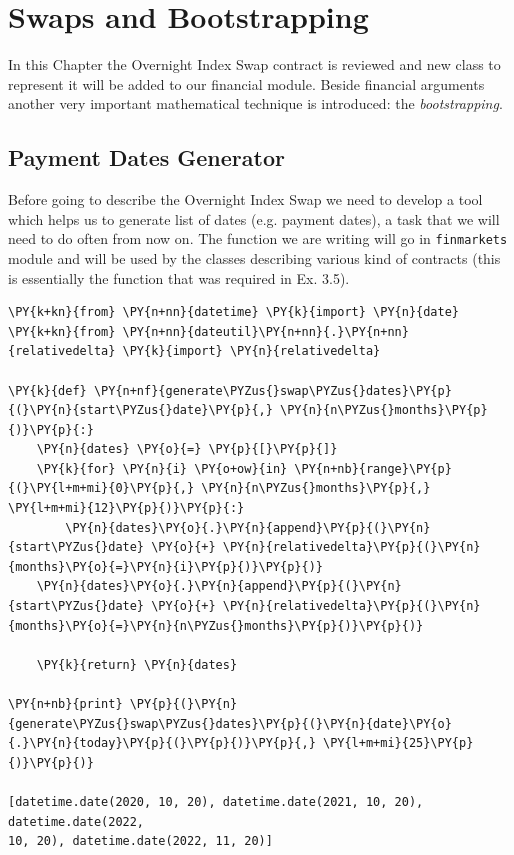 \chapter{Swaps and Bootstrapping}\label{swaps-and-bootstrapping---practical-lesson-5}


In this Chapter the Overnight Index Swap contract is reviewed and new class to represent it will be added to our financial module. Beside financial arguments another very important mathematical technique is introduced: the \emph{bootstrapping}.

\section{Payment Dates Generator}
Before going to describe the Overnight Index Swap we need to develop a tool which helps us to generate list of dates (e.g. payment dates), a task that we will need to do often from now on. 
The function we are writing will go in \texttt{finmarkets} module and will be used by the classes describing various kind of contracts (this is essentially the function that was required in Ex. 3.5).

\begin{tcolorbox}[size=fbox, boxrule=1pt, colback=cellbackground, colframe=cellborder]
\begin{Verbatim}[commandchars=\\\{\}]
\PY{k+kn}{from} \PY{n+nn}{datetime} \PY{k}{import} \PY{n}{date}
\PY{k+kn}{from} \PY{n+nn}{dateutil}\PY{n+nn}{.}\PY{n+nn}{relativedelta} \PY{k}{import} \PY{n}{relativedelta}

\PY{k}{def} \PY{n+nf}{generate\PYZus{}swap\PYZus{}dates}\PY{p}{(}\PY{n}{start\PYZus{}date}\PY{p}{,} \PY{n}{n\PYZus{}months}\PY{p}{)}\PY{p}{:}
    \PY{n}{dates} \PY{o}{=} \PY{p}{[}\PY{p}{]}
    \PY{k}{for} \PY{n}{i} \PY{o+ow}{in} \PY{n+nb}{range}\PY{p}{(}\PY{l+m+mi}{0}\PY{p}{,} \PY{n}{n\PYZus{}months}\PY{p}{,} \PY{l+m+mi}{12}\PY{p}{)}\PY{p}{:}
        \PY{n}{dates}\PY{o}{.}\PY{n}{append}\PY{p}{(}\PY{n}{start\PYZus{}date} \PY{o}{+} \PY{n}{relativedelta}\PY{p}{(}\PY{n}{months}\PY{o}{=}\PY{n}{i}\PY{p}{)}\PY{p}{)}
    \PY{n}{dates}\PY{o}{.}\PY{n}{append}\PY{p}{(}\PY{n}{start\PYZus{}date} \PY{o}{+} \PY{n}{relativedelta}\PY{p}{(}\PY{n}{months}\PY{o}{=}\PY{n}{n\PYZus{}months}\PY{p}{)}\PY{p}{)}
    
    \PY{k}{return} \PY{n}{dates}

\PY{n+nb}{print} \PY{p}{(}\PY{n}{generate\PYZus{}swap\PYZus{}dates}\PY{p}{(}\PY{n}{date}\PY{o}{.}\PY{n}{today}\PY{p}{(}\PY{p}{)}\PY{p}{,} \PY{l+m+mi}{25}\PY{p}{)}\PY{p}{)}

[datetime.date(2020, 10, 20), datetime.date(2021, 10, 20), datetime.date(2022,
10, 20), datetime.date(2022, 11, 20)]
    \end{Verbatim}
\end{tcolorbox}

